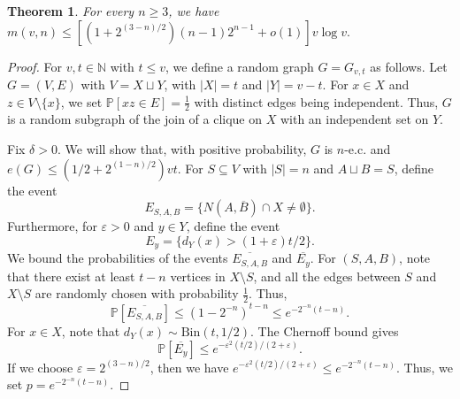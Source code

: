 \documentclass{article}
\newcommand\sm{\setminus}
\newtheorem{thm}{Theorem}
\theoremstyle{definition}
\begin{document}
\begin{thm} \label{n>2 upper bound}
    For every $n\ge 3$, we have $m(v,n)\le[(1+2^{(3-n)/2})(n-1)2^{n-1}+o(1)]v\log v.$
\end{thm}
\begin{proof}

For $v,t\in\mathbb N$ with $t\le v$, we define a random graph $G=G_{v,t}$ as follows. Let $G=(V,E)$ with $V=X\sqcup Y$, with $|X|=t$ and $|Y|=v-t$. For $x\in X$ and $z\in V\sm\{x\}$, we set $\mathbb P[xz\in E]=\frac{1}{2}$ with distinct edges being independent. Thus, $G$ is a random subgraph of the join of a clique on $X$ with an independent set on $Y$.

Fix $\delta>0$. We will show that, with positive probability, $G$ is $n$-e.c. and $e(G)\le(1/2+2^{(1-n)/2})vt.$ For $S\subseteq V$ with $|S|=n$ and $A\sqcup B=S$, define the event
$$E_{S,A,B}=\{N(A,\overline B)\cap X\ne \emptyset\}.$$
Furthermore, for $\varepsilon>0$ and $y\in Y$, define the event
$$E_y=\{d_Y(x)>(1+\varepsilon)t/2\}.$$
We bound the probabilities of the events $\overline{E_{S,A,B}}$ and $\overline{E_y}$. For $(S,A,B)$, note that there exist at least $t-n$ vertices in $X\sm S$, and all the edges between $S$ and $X\sm S$ are randomly chosen with probability $\frac{1}{2}$. Thus,
$$\mathbb P\left[\overline{E_{S,A,B}}\right]\le\left(1-2^{-n}\right)^{t-n}\le e^{-2^{-n}(t-n)}.$$
For $x\in X$, note that $d_Y(x)\sim \mathrm{Bin}(t,1/2)$. The Chernoff bound \cite{chernoff1952measure} gives
$$\mathbb P\left[\overline{E_y}\right]\le e^{-\varepsilon^2 (t/2)/(2+\varepsilon)}.$$
If we choose $\varepsilon=2^{(3-n)/2}$, then we have $e^{-\varepsilon^2(t/2)/(2+\varepsilon)}\le e^{-2^{-n}(t-n)}$. Thus, we set $p=e^{-2^{-n}(t-n)}$. 


\end{proof}
\end{document}
